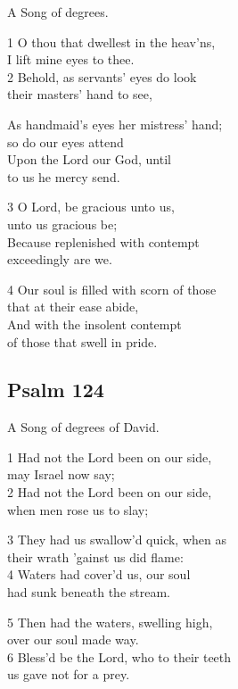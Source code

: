 A Song of degrees.

1 O thou that dwellest in the heav’ns,\\
I lift mine eyes to thee.\\
2 Behold, as servants’ eyes do look\\
their masters’ hand to see,

As handmaid’s eyes her mistress’ hand;\\
so do our eyes attend\\
Upon the Lord our God, until\\
to us he mercy send.

3 O Lord, be gracious unto us,\\
unto us gracious be;\\
Because replenished with contempt\\
exceedingly are we.

4 Our soul is filled with scorn of those\\
that at their ease abide,\\
And with the insolent contempt\\
of those that swell in pride.

\begin{center}
\quad{}\quad{}
\end{center}

\subsection*{Psalm 124}

A Song of degrees of David.

1 Had not the Lord been on our side,\\
may Israel now say;\\
2 Had not the Lord been on our side,\\
when men rose us to slay;

3 They had us swallow’d quick, when as\\
their wrath ’gainst us did flame:\\
4 Waters had cover’d us, our soul\\
had sunk beneath the stream.

5 Then had the waters, swelling high,\\
over our soul made way.\\
6 Bless’d be the Lord, who to their teeth\\
us gave not for a prey.

